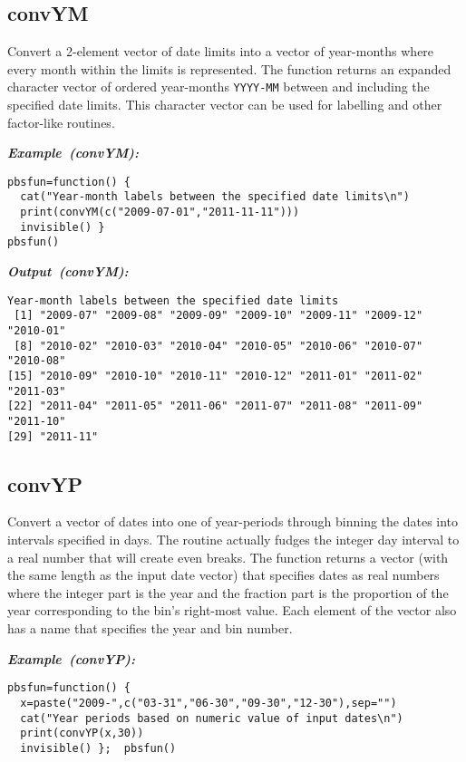 \documentclass[letterpaper,12pt,fleqn]{article}
\def\tab{\hspace{0.5 in}}
\newcommand{\code}[1]{\small\texttt{#1}\normalsize}
\newcommand\example[1]{    %
	\textbf{\emph{Example~(#1):}}\\ \vspace{3 pt}
}
\newcommand\results[1]{    %
	\textbf{\emph{Output~(#1):}}\\ \vspace{3 pt}
}
\begin{document}
\subsection {convYM}

\tab Convert a 2-element vector of date limits into a vector of year-months where every month within the limits is represented.  The function returns an expanded character vector of ordered year-months \code{YYYY-MM} between and including the specified date limits. This character vector can be used for labelling and other factor-like routines.

\begin{examplebox}
\example{convYM}
\begin{Verbatim}[fontsize=\footnotesize]
pbsfun=function() {
  cat("Year-month labels between the specified date limits\n")
  print(convYM(c("2009-07-01","2011-11-11")))
  invisible() }
pbsfun()
\end{Verbatim}
\end{examplebox}

\begin{outputbox}
\results{convYM}
\begin{Verbatim}[fontsize=\footnotesize]
Year-month labels between the specified date limits
 [1] "2009-07" "2009-08" "2009-09" "2009-10" "2009-11" "2009-12" "2010-01"
 [8] "2010-02" "2010-03" "2010-04" "2010-05" "2010-06" "2010-07" "2010-08"
[15] "2010-09" "2010-10" "2010-11" "2010-12" "2011-01" "2011-02" "2011-03"
[22] "2011-04" "2011-05" "2011-06" "2011-07" "2011-08" "2011-09" "2011-10"
[29] "2011-11"
\end{Verbatim}
\end{outputbox}

\subsection {convYP}

\tab Convert a vector of dates into one of year-periods through binning the dates into intervals specified in days. The routine actually fudges the integer day interval to a real number that will create even breaks. The function returns a vector (with the same length as the input date vector) that specifies dates as real numbers where the integer part is the year and the fraction part is the proportion of the year corresponding to the bin's right-most value. Each element of the vector also has a name that specifies the year and bin number.

\begin{examplebox}
\example{convYP}
\begin{Verbatim}[fontsize=\footnotesize]
pbsfun=function() {
  x=paste("2009-",c("03-31","06-30","09-30","12-30"),sep="")
  cat("Year periods based on numeric value of input dates\n")
  print(convYP(x,30))
  invisible() };  pbsfun()
\end{Verbatim}
\end{examplebox}
\end{document}
